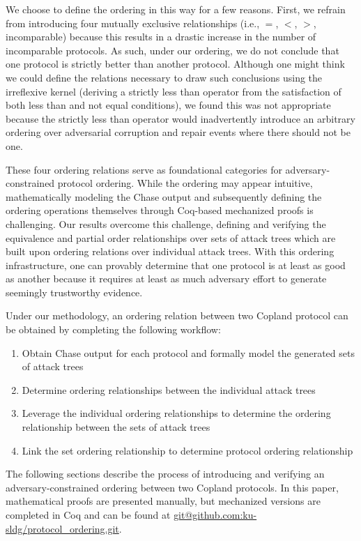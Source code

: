 \documentclass[runningheads]{llncs}
\theoremstyle{definition}
\newcommand{\squash}{\itemsep=0pt\parskip=0pt}
\begin{document}
\noindent We choose to define the ordering in this way for a few reasons. First, we refrain from introducing four mutually exclusive relationships (i.e., $=$, $<$, $>$, incomparable) because this results in a drastic increase in the number of incomparable protocols. As such, under our ordering, we do not conclude that one protocol is strictly better than another protocol. Although one might think we could define the relations necessary to draw such conclusions using the irreflexive kernel (deriving a strictly less than operator from the satisfaction of both less than and not equal conditions), we found this was not appropriate because the strictly less than operator would inadvertently introduce an arbitrary ordering over adversarial corruption and repair events where there should not be one.  


These four ordering relations serve as foundational categories for adversary-constrained protocol ordering. While the ordering may appear intuitive, mathematically modeling the Chase output and subsequently defining the ordering operations themselves through Coq-based mechanized proofs is challenging. Our results overcome this challenge, defining and verifying the equivalence and partial order relationships over sets of attack trees which are built upon ordering relations over individual attack trees. With this ordering infrastructure, one can provably determine that one protocol is at least as good as another because it requires at least as much adversary effort to generate seemingly trustworthy evidence. 

Under our methodology, an ordering relation between two Copland protocol can be obtained by completing the following workflow:

\begin{enumerate}
    \squash
    \item Obtain Chase output for each protocol and formally model the generated sets of attack trees
    \item Determine ordering relationships between the individual attack trees
    \item Leverage the individual ordering relationships to determine the ordering relationship between the sets of attack trees
    \item Link the set ordering relationship to determine protocol ordering relationship
\end{enumerate}

The following sections describe the process of introducing and verifying an adversary-constrained ordering between two Copland protocols. In this paper, mathematical proofs are presented manually, but mechanized versions are completed in Coq and can be found at \url{git@github.com:ku-sldg/protocol_ordering.git}.
\end{document}
